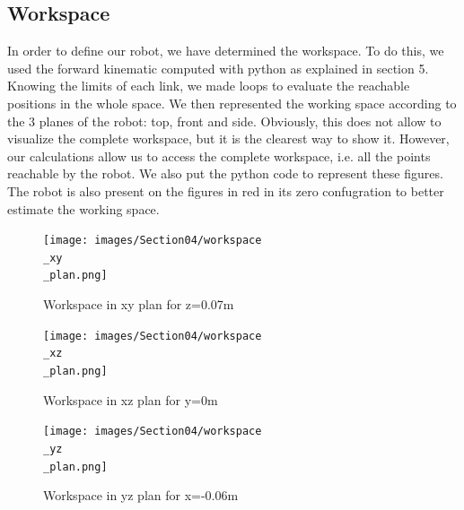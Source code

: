 \subsection{Workspace}

In order to define our robot, we have determined the workspace. To do this, we used the forward kinematic computed with python as explained in section 5. Knowing the limits of each link, we made loops to evaluate the reachable positions in the whole space. We then represented the working space according to the 3 planes of the robot: top, front and side. Obviously, this does not allow to visualize the complete workspace, but it is the clearest way to show it. However, our calculations allow us to access the complete workspace, i.e. all the points reachable by the robot. We also put the python code to represent these figures. The robot is also present on the figures in red in its zero confugration to better estimate the working space.

\begin{figure}[ht]
    \centering
    \texttt{[image: images/Section04/workspace\\\_xy\\\_plan.png]}
    \caption{Workspace in xy plan for z=0.07m}
    \label{fig:mesh22}
\end{figure}
\FloatBarrier

\begin{figure}[ht]
    \centering
    \texttt{[image: images/Section04/workspace\\\_xz\\\_plan.png]}
    \caption{Workspace in xz plan for y=0m}
    \label{fig:mesh23}
\end{figure}
\FloatBarrier

\begin{figure}[ht]
    \centering
    \texttt{[image: images/Section04/workspace\\\_yz\\\_plan.png]}
    \caption{Workspace in yz plan for x=-0.06m }
    \label{fig:mesh24}
\end{figure}
\FloatBarrier

